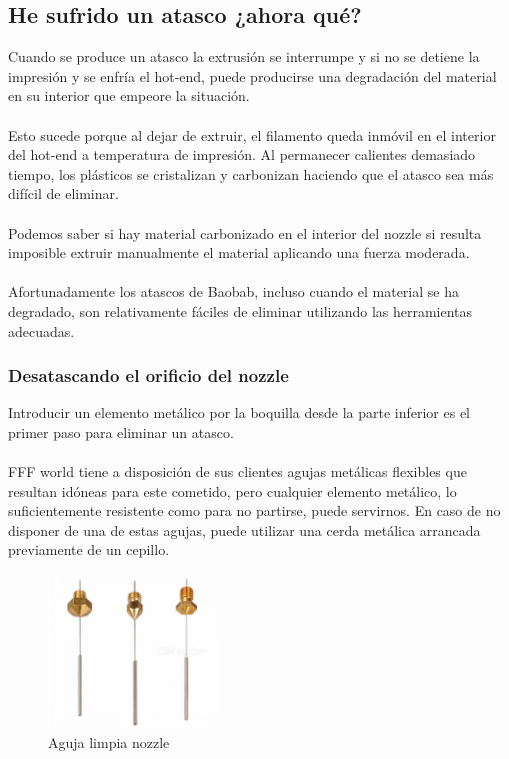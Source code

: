 \documentclass[11pt,a4paper]{article}
\begin{document}
	\subsection{He sufrido un atasco ¿ahora qué?}
Cuando se produce un atasco la extrusión se interrumpe y si no se detiene la impresión y se enfría el hot-end, puede producirse una degradación del material en su interior que empeore la situación.\\\\
Esto sucede porque al dejar de extruir, el filamento queda inmóvil en el interior del hot-end a temperatura de impresión. Al permanecer calientes demasiado tiempo, los plásticos se cristalizan y carbonizan haciendo que el atasco sea más difícil de eliminar.\\\\
Podemos saber si hay material carbonizado en el interior del nozzle si resulta imposible extruir manualmente el material aplicando una fuerza moderada.\\\\
Afortunadamente los atascos de Baobab, incluso cuando el material se ha degradado, son relativamente fáciles de eliminar utilizando las herramientas adecuadas.	\subsubsection{Desatascando el orificio del nozzle}
Introducir un elemento metálico por la boquilla desde la parte inferior es el primer paso para eliminar un atasco.\\\\
FFF world tiene a disposición de sus clientes agujas metálicas flexibles que resultan idóneas para este cometido, pero cualquier elemento metálico, lo suficientemente resistente como para no partirse, puede servirnos. En caso de no disponer de una de estas agujas, puede utilizar una cerda metálica arrancada previamente de un cepillo.\begin{figure}[H]
\centering
\includegraphics[width=0.4\textwidth,cfbox=azul_marcos 4pt 0pt]{FOTOS/NEDDLE}
\caption*{Aguja limpia nozzle}
\end{figure}
\end{document}
